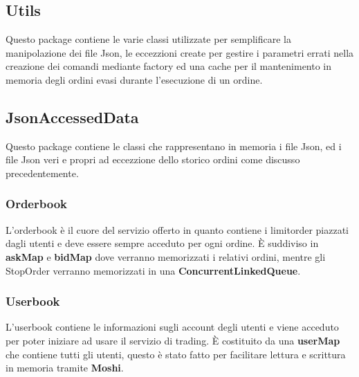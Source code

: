 \documentclass{article}
\begin{document}
\subsection{Utils}
Questo package contiene le varie classi utilizzate per semplificare la manipolazione dei file Json, le eccezzioni create per gestire i parametri errati nella creazione dei comandi mediante factory ed una cache per il mantenimento in memoria degli ordini evasi durante l'esecuzione di un ordine.

\subsection{JsonAccessedData}
Questo package contiene le classi che rappresentano in memoria i file Json, ed i file Json veri e propri ad eccezzione dello storico ordini come discusso precedentemente.

\subsubsection{Orderbook}
L'orderbook è il cuore del servizio offerto in quanto contiene i limitorder piazzati dagli utenti e deve essere sempre acceduto per ogni ordine. È suddiviso in \textbf{askMap} e \textbf{bidMap} dove verranno memorizzati i relativi ordini, mentre gli StopOrder verranno memorizzati in una \textbf{ConcurrentLinkedQueue}.
\subsubsection{Userbook}
L'userbook contiene le informazioni sugli account degli utenti e viene acceduto per poter iniziare ad usare il servizio di trading. È costituito da una \textbf{userMap} che contiene tutti gli utenti, questo è stato fatto per facilitare lettura e scrittura in memoria tramite \textbf{Moshi}. 
\end{document}
